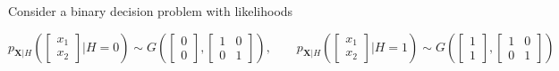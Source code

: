 \begin{solution}
\end{solution}

\else

\question Consider a binary decision problem with likelihoods

\[
p_{\mathbf X|H}\left ( \left [
  \begin{array}{c}
    x_1\\x_2
  \end{array}
\right ]|H=0\right) \sim G\left (\left [
  \begin{array}{c}
    0\\0
  \end{array}
\right ], \left [
\begin{array}{cc}
  1 & 0\\0 & 1
\end{array} \right]
\right ), \qquad p_{\mathbf X|H}\left ( \left [
  \begin{array}{c}
    x_1\\x_2
  \end{array}
\right ]|H=1\right) \sim G\left (\left [
  \begin{array}{c}
    1\\1
  \end{array}
\right ], \left [
\begin{array}{cc}
  1 & 0\\0 & 1
\end{array} \right]
\right )
\]

